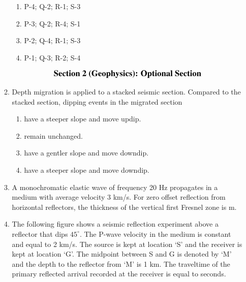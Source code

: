 \documentclass[journal,12pt,onecolumn]{IEEEtran}
\begin{document}
\begin{enumerate}
\begin{enumerate}
\hfill{}

\begin{multicols}{2}
\begin{enumerate}
\item P-4; Q-2; R-1; S-3
\item P-3; Q-2; R-4; S-1
\item P-2; Q-4; R-1; S-3
\item P-1; Q-3; R-2; S-4
\end{enumerate}
\end{multicols}



\begin{align*}
    {\large{\textbf{Section 2 (Geophysics): Optional Section}}}
\end{align*}








\item Depth migration is applied to a stacked seismic section. Compared to the stacked section, dipping events in the migrated section

\hfill{}


\begin{enumerate}[label=(\Alph*)]
\item have a steeper slope and move updip.
\item remain unchanged.
\item have a gentler slope and move downdip.
\item have a steeper slope and move downdip.
\end{enumerate}

\item A monochromatic elastic wave of frequency 20 Hz propagates in a medium with average velocity 3 km/s. For zero offset reflection from horizontal reflectors, the thickness of the vertical first Fresnel zone is \underline{\hspace{3cm}} m.

\hfill{}

\item The following figure shows a seismic reflection experiment above a reflector that dips $45^\circ$. The P-wave velocity in the medium is constant and equal to 2 km/s. The source is kept at location `S' and the receiver is kept at location `G'. The midpoint between S and G is denoted by `M' and the depth to the reflector from `M' is 1 km. The traveltime of the primary reflected arrival recorded at the receiver is equal to \underline{\hspace{3cm}} seconds.


\end{enumerate}
\end{enumerate}
\end{document}
